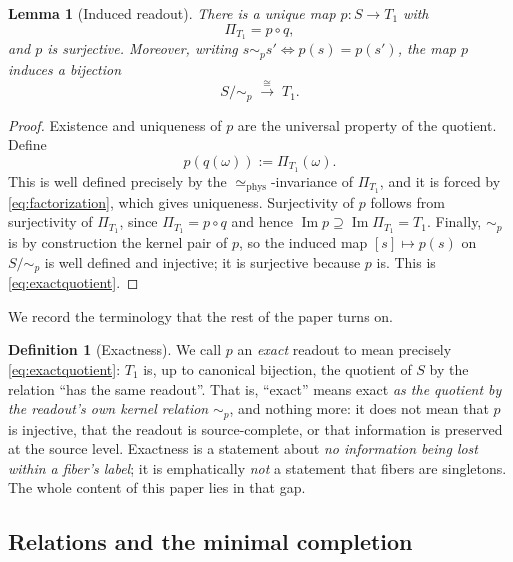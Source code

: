 \documentclass[11pt,reqno]{amsart}
\theoremstyle{plain}
\newtheorem{lemma}[theorem]{Lemma}
\theoremstyle{definition}
\newtheorem{definition}[theorem]{Definition}
\theoremstyle{remark}
\DeclareMathOperator{\Ima}{Im}
\begin{document}
\begin{lemma}[Induced readout]\label{lem:induced}
There is a unique map $p\colon S\to T_1$ with
\begin{equation}\label{eq:factorization}
\Pi_{T_1}=p\circ q,
\end{equation}
and $p$ is surjective. Moreover, writing $s\sim_p s'\iff p(s)=p(s')$, the map $p$ induces a bijection
\begin{equation}\label{eq:exactquotient}
S/\!\sim_p\;\xrightarrow{\ \cong\ }\;T_1 .
\end{equation}
\end{lemma}

\begin{proof}
Existence and uniqueness of $p$ are the universal property of the quotient. Define
\[
p(q(\omega)):=\Pi_{T_1}(\omega).
\]
This is well defined precisely by the $\simeq_{\mathrm{phys}}$-invariance of $\Pi_{T_1}$, and it is forced by \eqref{eq:factorization}, which gives uniqueness. Surjectivity of $p$ follows from surjectivity of $\Pi_{T_1}$, since $\Pi_{T_1}=p\circ q$ and hence $\Ima p\supseteq\Ima\Pi_{T_1}=T_1$. Finally, $\sim_p$ is by construction the kernel pair of $p$, so the induced map $[s]\mapsto p(s)$ on $S/\!\sim_p$ is well defined and injective; it is surjective because $p$ is. This is \eqref{eq:exactquotient}.
\end{proof}

We record the terminology that the rest of the paper turns on.

\begin{definition}[Exactness]\label{def:exact}
We call $p$ an \emph{exact} readout to mean precisely \eqref{eq:exactquotient}: $T_1$ is, up to canonical bijection, the quotient of $S$ by the relation ``has the same readout''. That is, ``exact'' means exact \emph{as the quotient by the readout's own kernel relation} $\sim_p$, and nothing more: it does not mean that $p$ is injective, that the readout is source-complete, or that information is preserved at the source level. Exactness is a statement about \emph{no information being lost within a fiber's label}; it is emphatically \emph{not} a statement that fibers are singletons. The whole content of this paper lies in that gap.
\end{definition}

\subsection{Relations and the minimal completion}
\end{document}
